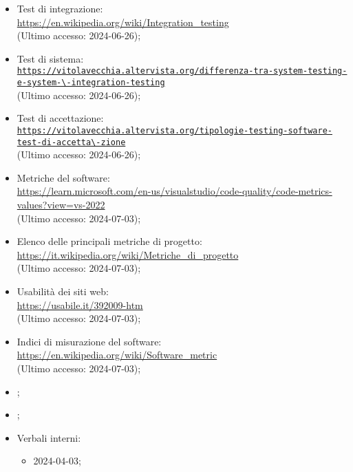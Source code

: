 \begin{itemize}
  \item Test di integrazione: \\ \href{https://en.wikipedia.org/wiki/Integration_testing}{https://en.wikipedia.org/wiki/Integration\_testing}  \\ (Ultimo accesso: 2024-06-26);
  \item Test di sistema: \\ \href{https://vitolavecchia.altervista.org/differenza-tra-system-testing-e-system-integration-testing}{\nolinkurl{https://vitolavecchia.altervista.org/differenza-tra-system-testing-e-system-\-integration-testing}}  \\ (Ultimo accesso: 2024-06-26);
  \item Test di accettazione: \\ \href{https://vitolavecchia.altervista.org/tipologie-testing-software-test-di-accettazione}{\nolinkurl{https://vitolavecchia.altervista.org/tipologie-testing-software-test-di-accetta\-zione}}  \\ (Ultimo accesso: 2024-06-26);
  \item Metriche del software: \\ \href{https://learn.microsoft.com/en-us/visualstudio/code-quality/code-metrics-values?view=vs-2022}{https://learn.microsoft.com/en-us/visualstudio/code-quality/code-metrics-values?view=vs-2022}  \\ (Ultimo accesso: 2024-07-03);
  \item Elenco delle principali metriche di progetto: \\ \href{https://it.wikipedia.org/wiki/Metriche_di_progetto}{https://it.wikipedia.org/wiki/Metriche\_di\_progetto}  \\ (Ultimo accesso: 2024-07-03); 
  \item Usabilità dei siti web: \\ \href{https://usabile.it/392009-htm}{https://usabile.it/392009-htm}  \\ (Ultimo accesso: 2024-07-03);
  \item Indici di misurazione del software: \\ \href{https://en.wikipedia.org/wiki/Software_metric}{https://en.wikipedia.org/wiki/Software\_metric}  \\ (Ultimo accesso: 2024-07-03);
  \item \Glossario;
  \item \PianoDiProgetto;
  \item Verbali interni:
  \begin{itemize}
    \item 2024-04-03;

\end{itemize}
\end{itemize}
